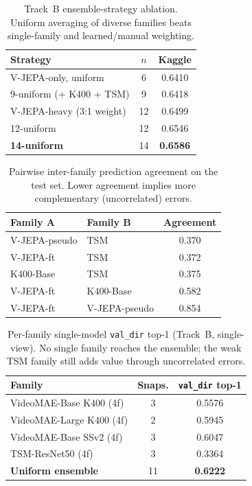 \documentclass[10pt,twocolumn,letterpaper]{article}
\begin{document}
\begin{table}[t]
\centering\small
\setlength{\tabcolsep}{5pt}
\begin{tabular}{@{}lcc@{}}
\toprule
Strategy & $n$ & Kaggle \\
\midrule
V-JEPA-only, uniform        & 6  & 0.6410 \\
9-uniform (+ K400 + TSM)    & 9  & 0.6418 \\
V-JEPA-heavy (3:1 weight)   & 12 & 0.6499 \\
12-uniform                  & 12 & 0.6546 \\
\textbf{14-uniform}         & 14 & \textbf{0.6586} \\
\bottomrule
\end{tabular}
\caption{Track~B ensemble-strategy ablation. Uniform averaging of diverse
families beats single-family and learned/manual weighting.}
\label{tab:strategy}
\end{table}

\begin{table}[t]
\centering\small
\setlength{\tabcolsep}{5pt}
\begin{tabular}{@{}llc@{}}
\toprule
Family A & Family B & Agreement \\
\midrule
V-JEPA-pseudo & TSM            & 0.370 \\
V-JEPA-ft     & TSM            & 0.372 \\
K400-Base     & TSM            & 0.375 \\
V-JEPA-ft     & K400-Base      & 0.582 \\
V-JEPA-ft     & V-JEPA-pseudo  & 0.854 \\
\bottomrule
\end{tabular}
\caption{Pairwise inter-family prediction agreement on the test set. Lower
agreement implies more complementary (uncorrelated) errors.}
\label{tab:agree}
\end{table}

\begin{table}[t]
\centering\small
\setlength{\tabcolsep}{5pt}
\begin{tabular}{@{}lcc@{}}
\toprule
Family & Snaps. & \texttt{val\_dir} top-1 \\
\midrule
VideoMAE-Base K400 (4f)   & 3  & 0.5576 \\
VideoMAE-Large K400 (4f)  & 2  & 0.5945 \\
VideoMAE-Base SSv2 (4f)   & 3  & 0.6047 \\
TSM-ResNet50 (4f)         & 3  & 0.3364 \\
\textbf{Uniform ensemble} & 11 & \textbf{0.6222} \\
\bottomrule
\end{tabular}
\caption{Per-family single-model \texttt{val\_dir} top-1 (Track~B, single-view).
No single family reaches the ensemble; the weak TSM family still adds value
through uncorrelated errors.}
\label{tab:perfamily}
\end{table}
\end{document}
